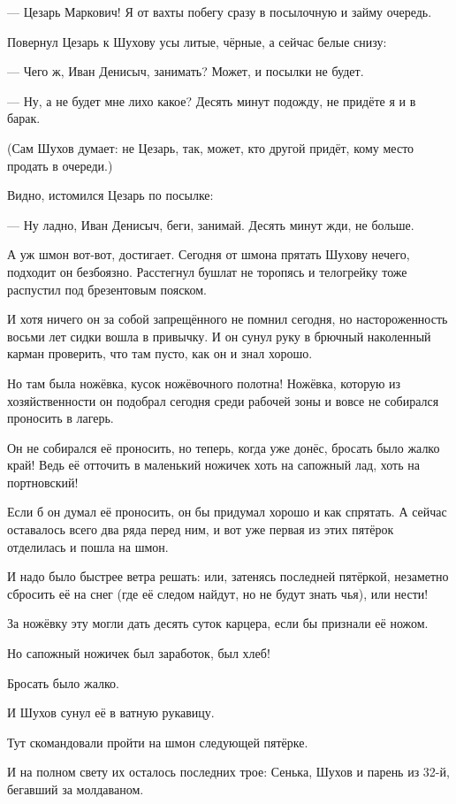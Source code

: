 --- Цезарь Маркович! Я от вахты побегу сразу в посылочную и займу очередь.

Повернул Цезарь к Шухову усы литые, чёрные, а сейчас белые снизу:

--- Чего ж, Иван Денисыч, занимать? Может, и посылки не будет.

--- Ну, а не будет \dash мне лихо какое? Десять минут подожду, не придёте \dash я и в барак.

(Сам Шухов думает: не Цезарь, так, может, кто другой придёт, кому место продать в очереди.)

Видно, истомился Цезарь по посылке:

--- Ну ладно, Иван Денисыч, беги, занимай. Десять минут жди, не больше.

А уж шмон вот-вот, достигает. Сегодня от шмона прятать Шухову нечего, подходит он безбоязно.
Расстегнул бушлат не торопясь и телогрейку тоже распустил под брезентовым пояском.

И хотя ничего он за собой запрещённого не помнил сегодня, но настороженность восьми лет
сидки вошла в привычку. И он сунул руку в брючный наколенный карман \dash проверить, что там
пусто, как он и знал хорошо.

Но там была ножёвка, кусок ножёвочного полотна! Ножёвка, которую из хозяйственности он
подобрал сегодня среди рабочей зоны и вовсе не собирался проносить в лагерь.

Он не собирался её проносить, но теперь, когда уже донёс, \dash бросать было жалко край! Ведь её
отточить в маленький ножичек \dash хоть на сапожный лад, хоть на портновский!

Если б он думал её проносить, он бы придумал хорошо и как спрятать. А сейчас оставалось всего
два ряда перед ним, и вот уже первая из этих пятёрок отделилась и пошла на шмон.

И надо было быстрее ветра решать: или, затенясь последней пятёркой, незаметно сбросить её на
снег (где её следом найдут, но не будут знать чья), или нести!

За ножёвку эту могли дать десять суток карцера, если бы признали её ножом.

Но сапожный ножичек был заработок, был хлеб!

Бросать было жалко.

И Шухов сунул её в ватную рукавицу.

Тут скомандовали пройти на шмон следующей пятёрке.

И на полном свету их осталось последних трое: Сенька, Шухов и парень из 32-й, бегавший за
молдаваном.

